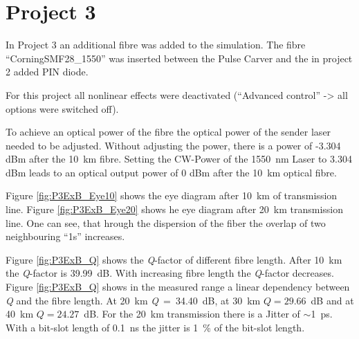 \section{Project 3}
\label{sec:P3}
In Project 3 an additional fibre was added to the simulation. The fibre "`CorningSMF28\_1550"' was inserted between the Pulse Carver and the in project 2 added PIN diode. 

For this project all nonlinear effects were deactivated ("`Advanced control"' -> all options were switched off).

To achieve an optical power of the fibre the optical power of the sender laser needed to be adjusted. Without adjusting the power, there is a power of -3.304 dBm after the 10~km fibre. Setting the CW-Power of the 1550~nm Laser to 3.304 dBm leads to an optical output power of 0 dBm after the 10~km optical fibre.

Figure \ref{fig:P3ExB_Eye10} shows the eye diagram after 10~km of transmission line. Figure \ref{fig:P3ExB_Eye20} shows he eye diagram after 20~km transmission line. One can see, that hrough the dispersion of the fiber the overlap of two neighbouring "`1s"' increases. 

Figure \ref{fig:P3ExB_Q} shows the \textit{Q}-factor of different fibre length. After 10~km the \textit{Q}-factor is 39.99~dB. With increasing fibre length the \textit{Q}-factor decreases. Figure \ref{fig:P3ExB_Q} shows in the measured range a linear dependency between \textit{Q} and the fibre length. At 20~km \textit{Q}~=~34.40~dB, at 30~km $Q=29.66$~dB and at 40~km $Q=24.27$~dB.
For the 20~km transmission there is a Jitter of $\sim$1~ps. With a bit-slot length of 0.1~ns the jitter is 1~\% of the bit-slot length.


